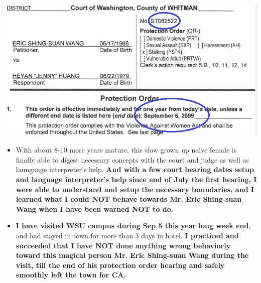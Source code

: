 \documentclass[9pt, b5paper]{article}
\begin{document}
\includegraphics[width=.9\linewidth]{./pic/dearCousin_20220919_222725.png}
\begin{itemize}
\item With about 8-10 more years mature, this slow grown up naive female is finally able to digest necessary concepts with the court and judge as well as launguage interpreter's help. \textbf{And with a few court hearing dates setup and language interpreter's help since end of July the first hearing, I were able to understand and setup the necessary boundaries, and I learned what I could NOT behave towards Mr. Eric Shing-suan Wang when I have been warned NOT to do}.
\item \textbf{I have visited WSU campus during Sep 5 this year long week end}, and had stayed in town for more than 3 days in hotel. \textbf{I practiced and succeeded that I have NOT done anything wrong behaviorly toward this magical person Mr. Eric Shing-suan Wang during the visit, till the end of his protection order hearing and safely smoothly left the town for CA.}  


\end{itemize}
\end{document}
